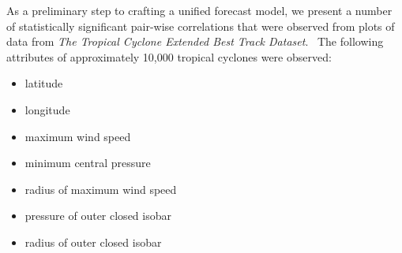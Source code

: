 \documentclass[letterpaper,twocolumn,10pt]{article}
\begin{document}
As a preliminary step to crafting a unified forecast model, we present a number
of statistically significant pair-wise correlations that were observed from
plots of data from \emph{The Tropical Cyclone Extended Best Track
Dataset}.~\cite{BestTrackDataset} The following attributes of approximately 
10,000 tropical cyclones were observed:
\begin{itemize}
  \item latitude
  \item longitude
  \item maximum wind speed
  \item minimum central pressure
  \item radius of maximum wind speed
  \item pressure of outer closed isobar
  \item radius of outer closed isobar
\end{itemize}





\end{document}

